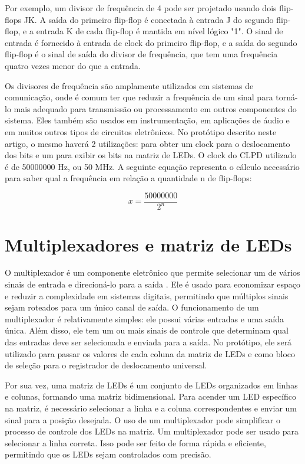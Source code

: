 Por exemplo, um divisor de frequência de 4 pode ser projetado usando dois flip-flops JK. A saída do primeiro flip-flop é conectada à entrada J do segundo flip-flop, e a entrada K de cada flip-flop é mantida em nível lógico "1". O sinal de entrada é fornecido à entrada de clock do primeiro flip-flop, e a saída do segundo flip-flop é o sinal de saída do divisor de frequência, que tem uma frequência quatro vezes menor do que a entrada.

Os divisores de frequência são amplamente utilizados em sistemas de comunicação, onde é comum ter que reduzir a frequência de um sinal para torná-lo mais adequado para transmissão ou processamento em outros componentes do sistema. Eles também são usados em instrumentação, em aplicações de áudio e em muitos outros tipos de circuitos eletrônicos. No protótipo descrito neste artigo, o mesmo haverá 2 utilizações: para obter um clock para o deslocamento dos bits e um para exibir os bits na matriz de LEDs. O clock do CLPD utilizado é de 50000000 Hz, ou 50 MHz. A seguinte equação representa o cálculo necessário para saber qual a frequência em relação a quantidade n de flip-flops:

\begin{equation} \label{Formula}
    x=\frac{50000000}{2^n}
\end{equation}

\section{Multiplexadores e matriz de LEDs}
O multiplexador é um componente eletrônico que permite selecionar um de vários sinais de entrada e direcioná-lo para a saída \cite{floyd}. Ele é usado para economizar espaço e reduzir a complexidade em sistemas digitais, permitindo que múltiplos sinais sejam roteados para um único canal de saída. O funcionamento de um multiplexador é relativamente simples: ele possui várias entradas e uma saída única. Além disso, ele tem um ou mais sinais de controle que determinam qual das entradas deve ser selecionada e enviada para a saída. No protótipo, ele será utilizado para passar os valores de cada coluna da matriz de LEDs e como bloco de seleção para o registrador de deslocamento universal. 

Por sua vez, uma matriz de LEDs é um conjunto de LEDs organizados em linhas e colunas, formando uma matriz bidimensional. Para acender um LED específico na matriz, é necessário selecionar a linha e a coluna correspondentes e enviar um sinal para a posição desejada. O uso de um multiplexador pode simplificar o processo de controle dos LEDs na matriz. Um multiplexador pode ser usado para selecionar a linha correta. Isso pode ser feito de forma rápida e eficiente, permitindo que os LEDs sejam controlados com precisão.

